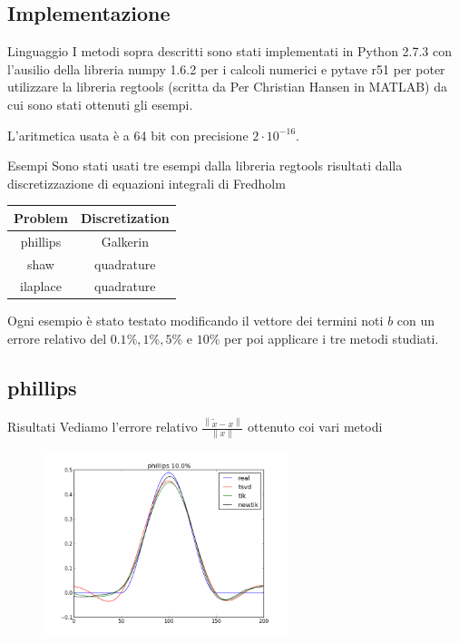 \documentclass{beamer}
\theoremstyle{plain}
\theoremstyle{definition}
\theoremstyle{remark}
\newcommand{\norm}[1]{\left\|#1\right\|}
\begin{document}
\subsection{Implementazione}

\begin{frame}{Linguaggio}
  I metodi sopra descritti sono stati implementati in Python 2.7.3 con
  l'ausilio della libreria numpy 1.6.2 per i calcoli numerici e pytave
  r51 per poter utilizzare la libreria regtools (scritta da  Per
  Christian Hansen in MATLAB) da cui sono stati ottenuti gli esempi.
  \vfill
  
  L'aritmetica usata è a 64 bit con precisione $2\cdot 10^{-16}$.
\end{frame}

\begin{frame}{Esempi}
  Sono stati usati tre esempi dalla libreria regtools risultati dalla
  discretizzazione di equazioni integrali di Fredholm
  \begin{center}
    \begin{tabular}[c]{c | c}
      \textbf{Problem} & \textbf{Discretization} \\
      \hline
      phillips & Galkerin \\
      shaw & quadrature \\
      ilaplace & quadrature 
    \end{tabular}
  \end{center}
  \vfill
  
  Ogni esempio è stato testato modificando il vettore dei termini noti
  $b$ con un errore relativo del $0.1\%, 1\%, 5\%$ e $10\%$ per poi
  applicare i tre metodi studiati.  
\end{frame}

\subsection{phillips}

\begin{frame}{Risultati}
  Vediamo l'errore relativo $\frac{\norm{\tilde x - x}}{\norm{x}}$
  ottenuto coi vari metodi
  \begin{center}
    
  \end{center}
\end{frame}

\begin{frame}
  \begin{figure}
    \centering
    \includegraphics[keepaspectratio,width=270px]{phillips_100.png}
  \end{figure}
\end{frame}
\end{document}
